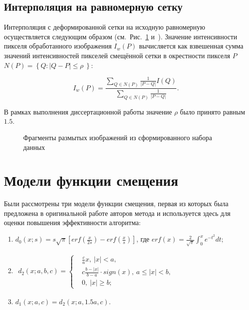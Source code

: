 \subsection{Интерполяция на равномерную сетку}

Интерполяция с деформированной сетки на исходную равномерную осуществляется следующим образом (см.~Рис.~\ref{fig:warping-interpolation} и~\cite{krylov2014gridwarping}). Значение интенсивности пикселя обработанного изображения $I_w(P)$ вычисляется как взвешенная сумма значений интенсивностей пикселей смещённой сетки в окрестности пикселя $P$ $N(P) = \left\{ Q: \lvert Q - P \rvert \leq \rho\ \right\}$:

\begin{equation*}
	I_w(P)=\frac{\sum_{Q \in N(P)} \frac{1}{\lvert P - Q \rvert} I(Q)}{\sum_{Q \in N(P)} \frac{1}{\lvert P - Q \rvert}}.
\end{equation*}

В рамках выполнения диссертационной работы значение $\rho$ было принято равным $1.5$.

\begin{figure}[ht]
	\caption{Фрагменты размытых изображений из сформированного набора данных}
	\label{fig:warping-interpolation}
\end{figure}


\section{Модели функции смещения}

Были рассмотрены три модели функции смещения, первая из которых была предложена в оригинальной работе авторов метода и используется здесь для оценки повышения эффективности алгоритма:
\begin{enumerate}[beginpenalty=10000]
	\item $d_0\left(x; s\right)=s\sqrt\pi\left[erf\left(\frac{x}{2s}\right)-erf\left(\frac{x}{s}\right)\right]$, где $erf{\left(x\right)}=\frac{2}{\sqrt\pi}\int_{0}^{x}{e^{-t^2}dt}$;
	
	\item
	$
	\begin{aligned}
		d_2\left(x; a, b, c\right)=\left\{
		\begin{aligned}
			&\frac{c}{a}x,\ \left|x\right|<a,\\
			&c\frac{b-\left|x\right|}{b-a} \cdot sign\left(x\right),\ a\le\left|x\right|<b,\\
			&0,\ \left|x\right|\geq b;
		\end{aligned}
		\right.
	\end{aligned}
	$
	
	\item $d_1\left(x; a, c\right) = d_2\left(x; a, 1.5a, c\right)$.
\end{enumerate}

